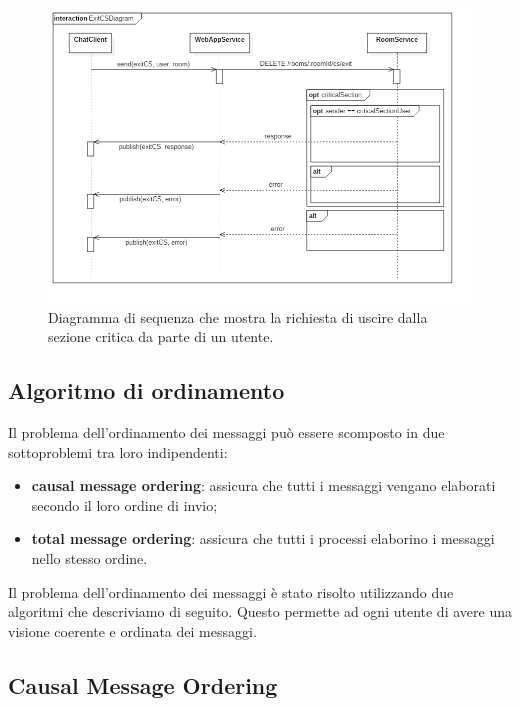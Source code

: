 \documentclass[a4paper]{article}
\begin{document}
\begin{figure}[H]
    \centering
    \includegraphics[width=\linewidth, height=\textheight, keepaspectratio]{res/ExitCSDiagram.png}
        \caption{Diagramma di sequenza che mostra la richiesta di uscire dalla sezione critica da parte di un utente.}
    \label{fig:exitCS-diagram}
\end{figure}


\subsection{Algoritmo di ordinamento}\label{ordinamento}

Il problema dell'ordinamento dei messaggi può essere scomposto in due sottoproblemi tra loro indipendenti:

\begin{itemize}
%
    \item\textbf{causal message ordering}: assicura che tutti i messaggi vengano elaborati secondo il loro ordine di invio;
%
    \item\textbf{total message ordering}: assicura che tutti i processi elaborino i messaggi nello stesso ordine.
%
\end{itemize}

Il problema dell'ordinamento dei messaggi è stato risolto utilizzando due algoritmi che descriviamo di seguito. Questo permette ad ogni utente di avere una visione coerente e ordinata dei messaggi.

\subsection{Causal Message Ordering}\label{causal-message-ordering}
\end{document}
